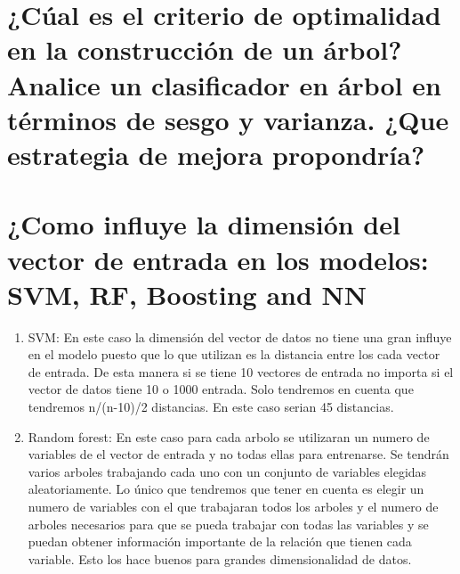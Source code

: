 \documentclass[titlepage]{article}
\begin{document}
\section{¿Cúal es el criterio de optimalidad en la construcción de un árbol? Analice un clasificador en árbol en términos de sesgo y varianza. ¿Que estrategia de mejora propondría?}

\section{¿Como influye la dimensión del vector de entrada en los modelos: SVM, RF, Boosting and NN}

\begin{enumerate}
	\item SVM: En este caso la dimensión del vector de datos no tiene una gran influye en el modelo puesto que lo que utilizan es la distancia entre los cada vector de entrada. De esta manera si se tiene 10 vectores de entrada no importa si el vector de datos tiene 10 o 1000 entrada. Solo tendremos en cuenta que tendremos n/(n-10)/2 distancias. En este caso serian 45 distancias.
	
	\item Random forest: En este caso para cada arbolo se utilizaran un numero de variables de el vector de entrada y no todas ellas para entrenarse. Se tendrán varios arboles trabajando cada uno con un conjunto de variables elegidas aleatoriamente. Lo único que tendremos que tener en cuenta es elegir un numero de variables con el que trabajaran todos los arboles y el numero de arboles necesarios para que se pueda trabajar con todas las variables y se puedan obtener información importante de la relación que tienen cada variable. Esto los hace buenos para grandes dimensionalidad de datos.
\end{enumerate}
\end{document}
